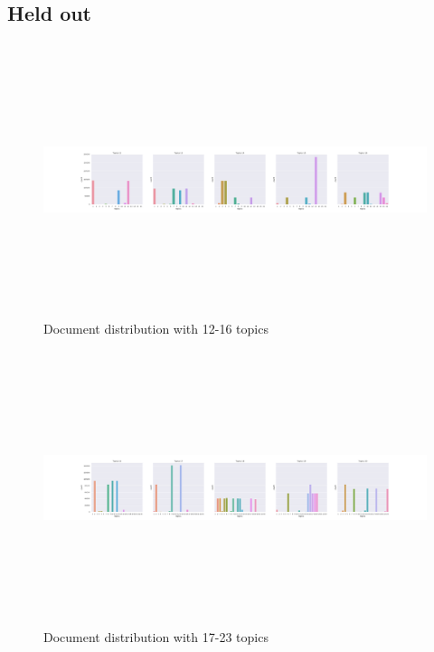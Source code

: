 \subsection{Held out}
\begin{figure}[h]
    \centering
    \includegraphics[width=15cm, height=8cm]{figures/doc_distr/doc_distribution_12-16_corpus.png}
    \caption{Document distribution with 12-16 topics}
    \label{fig:Doc_distr_12-16}
\end{figure}

\begin{figure}[h]
    \centering
    \includegraphics[width=15cm, height=8cm]{figures/doc_distr/doc_distribution_17-23_corpus.png}
    \caption{Document distribution with 17-23 topics}
    \label{fig:Doc_distr_17-21}
\end{figure}

